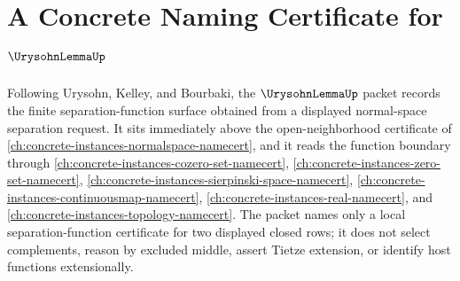 \chapter{A Concrete Naming Certificate for $\UrysohnLemmaUp$}
\label{ch:concrete-instances-urysohn-lemma-namecert}

Following Urysohn, Kelley, and Bourbaki, the $\UrysohnLemmaUp$ packet records the finite separation-function surface obtained from a displayed normal-space separation request. It sits immediately above the open-neighborhood certificate of \autoref{ch:concrete-instances-normalspace-namecert}, and it reads the function boundary through \autoref{ch:concrete-instances-cozero-set-namecert}, \autoref{ch:concrete-instances-zero-set-namecert}, \autoref{ch:concrete-instances-sierpinski-space-namecert}, \autoref{ch:concrete-instances-continuousmap-namecert}, \autoref{ch:concrete-instances-real-namecert}, and \autoref{ch:concrete-instances-topology-namecert}. The packet names only a local separation-function certificate for two displayed closed rows; it does not select complements, reason by excluded middle, assert Tietze extension, or identify host functions extensionally.

